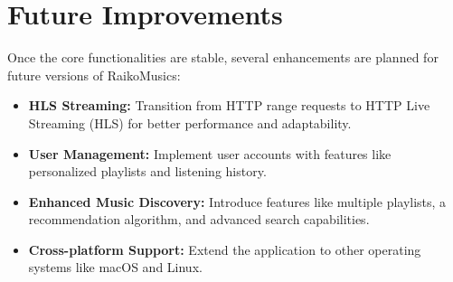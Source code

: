\documentclass[12pt,a4paper]{article} %
\begin{document}
\section{Future Improvements}
Once the core functionalities are stable, several enhancements are planned for future versions of RaikoMusics:
\begin{itemize}
    \item \textbf{HLS Streaming:} Transition from HTTP range requests to HTTP Live Streaming (HLS) for better performance and adaptability.
    \item \textbf{User Management:} Implement user accounts with features like personalized playlists and listening history.
    \item \textbf{Enhanced Music Discovery:} Introduce features like multiple playlists, a recommendation algorithm, and advanced search capabilities.
    \item \textbf{Cross-platform Support:} Extend the application to other operating systems like macOS and Linux.
\end{itemize}
\end{document}
